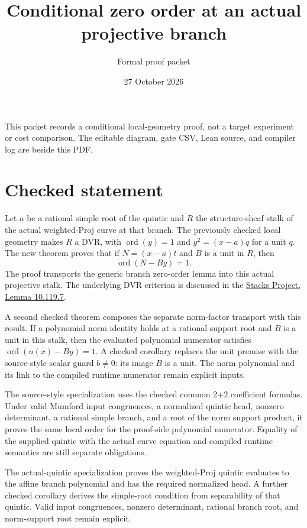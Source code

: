 \documentclass[10pt]{article}
\title{Conditional zero order at an actual projective branch}
\author{Formal proof packet}
\date{27 October 2026}
\begin{document}
\maketitle
\noindent This packet records a conditional local-geometry proof, not a target experiment or cost comparison. The editable diagram, gate CSV, Lean source, and compiler log are beside this PDF.

\section*{Checked statement}
Let $a$ be a rational simple root of the quintic and $R$ the structure-sheaf stalk of the actual weighted-Proj curve at that branch. The previously checked local geometry makes $R$ a DVR, with $\operatorname{ord}(y)=1$ and $y^2=(x-a)q$ for a unit $q$. The new theorem proves that if $N=(x-a)t$ and $B$ is a unit in $R$, then
\[
\operatorname{ord}(N-By)=1.
\]
The proof transports the generic branch zero-order lemma into this actual projective stalk. The underlying DVR criterion is discussed in the \href{https://stacks.math.columbia.edu/tag/00PD}{Stacks Project, Lemma 10.119.7}.

A second checked theorem composes the separate norm-factor transport with this result. If a polynomial norm identity holds at a rational support root and $B$ is a unit in this stalk, then the evaluated polynomial numerator satisfies $\operatorname{ord}(n(x)-By)=1$. A checked corollary replaces the unit premise with the source-style scalar guard $b\ne0$: its image $B$ is a unit. The norm polynomial and its link to the compiled runtime numerator remain explicit inputs.

The source-style specialization uses the checked common 2+2 coefficient formulas. Under valid Mumford input congruences, a normalized quintic head, nonzero determinant, a rational simple branch, and a root of the norm support product, it proves the same local order for the proof-side polynomial numerator. Equality of the supplied quintic with the actual curve equation and compiled runtime semantics are still separate obligations.

The actual-quintic specialization proves the weighted-Proj quintic evaluates to the affine branch polynomial and has the required normalized head. A further checked corollary derives the simple-root condition from separability of that quintic. Valid input congruences, nonzero determinant, rational branch root, and norm-support root remain explicit.
\end{document}
